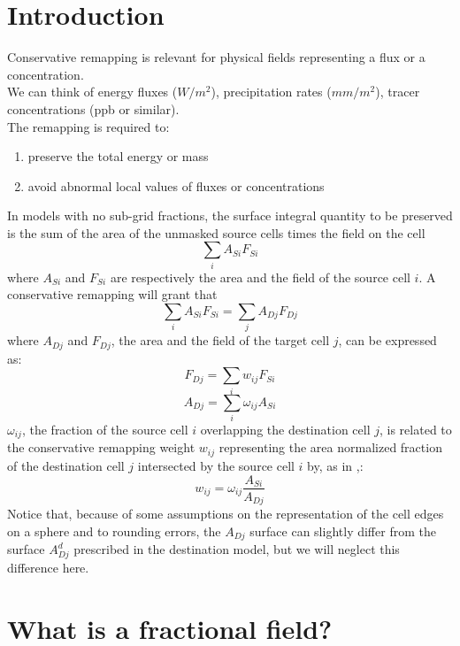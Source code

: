 \section{Introduction}

Conservative remapping is relevant for physical fields representing a flux or a concentration. \\
We can think of energy fluxes ($W/m^2$), 
precipitation rates ($mm/m^2$), tracer concentrations (ppb or similar).\\
The remapping is required to:
\begin{enumerate}
    \item preserve the total energy or mass
    \item avoid abnormal local values of fluxes or concentrations

\end{enumerate}
In models with no sub-grid fractions, the surface integral quantity to be preserved is the sum of the area of the unmasked source cells times the field on the cell
\[\sum_iA_{Si}F_{Si}\]
where \(A_{Si}\) and \(F_{Si}\) are respectively the area and the field of the source cell \(i\).
A conservative remapping will grant that
\[\sum_iA_{Si}F_{Si} = \sum_jA_{Dj}F_{Dj}\]
where \(A_{Dj}\) and \(F_{Dj}\), the area and the field of the target cell \(j\), can be expressed as:
\[F_{Dj} = \sum_iw_{ij}F_{Si} \]
\[A_{Dj} = \sum_i\omega_{ij}A_{Si}\]
\(\omega_{ij}\), the fraction of the source cell \(i\) overlapping the destination cell \(j\), is related to the conservative remapping weight \(w_{ij}\) representing the area normalized fraction of the destination cell \(j\) intersected by the source cell \(i\) by, as in \cite{gmd-17-415-2024},:
\[w_{ij}=\omega_{ij}\frac{A_{Si}}{A_{Dj}}\]
Notice that, because of some assumptions on the representation of the cell edges on a sphere and to rounding errors, the \(A_{Dj}\) surface can slightly differ from the surface \(A^d_{Dj}\) prescribed in the destination model, but we will neglect this difference here. 

\section{What is a fractional field?}

